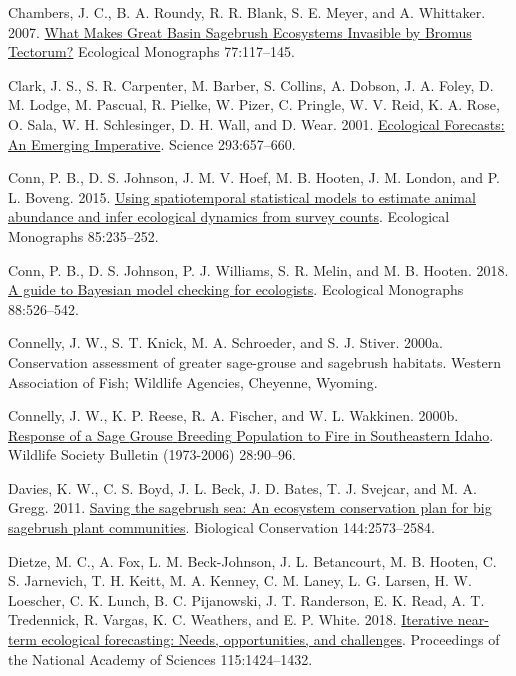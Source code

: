 \documentclass[
  12pt,
]{article}
\newlength{\cslhangindent}
\newlength{\cslentryspacingunit} %
\newenvironment{CSLReferences}[2] %
 {%
  \setlength{\parindent}{0pt}
  \ifodd #1
  \let\oldpar\par
  \def\par{\hangindent=\cslhangindent\oldpar}
  \fi
  \setlength{\parskip}{#2\cslentryspacingunit}
 }%
 {}
\begin{document}
\begin{CSLReferences}{1}{0}
\leavevmode{}%
Chambers, J. C., B. A. Roundy, R. R. Blank, S. E. Meyer, and A. Whittaker. 2007. \href{https://doi.org/10.1890/05-1991}{What {Makes} {Great} {Basin} {Sagebrush} {Ecosystems} {Invasible} by {Bromus} {Tectorum}?} Ecological Monographs 77:117--145.

\leavevmode{}%
Clark, J. S., S. R. Carpenter, M. Barber, S. Collins, A. Dobson, J. A. Foley, D. M. Lodge, M. Pascual, R. Pielke, W. Pizer, C. Pringle, W. V. Reid, K. A. Rose, O. Sala, W. H. Schlesinger, D. H. Wall, and D. Wear. 2001. \href{https://doi.org/10.1126/science.293.5530.657}{Ecological {Forecasts}: {An} {Emerging} {Imperative}}. Science 293:657--660.

\leavevmode{}%
Conn, P. B., D. S. Johnson, J. M. V. Hoef, M. B. Hooten, J. M. London, and P. L. Boveng. 2015. \href{https://doi.org/10.1890/14-0959.1}{Using spatiotemporal statistical models to estimate animal abundance and infer ecological dynamics from survey counts}. Ecological Monographs 85:235--252.

\leavevmode{}%
Conn, P. B., D. S. Johnson, P. J. Williams, S. R. Melin, and M. B. Hooten. 2018. \href{https://doi.org/10.1002/ecm.1314}{A guide to {Bayesian} model checking for ecologists}. Ecological Monographs 88:526--542.

\leavevmode{}%
Connelly, J. W., S. T. Knick, M. A. Schroeder, and S. J. Stiver. 2000a. Conservation assessment of greater sage-grouse and sagebrush habitats. Western Association of Fish; Wildlife Agencies, Cheyenne, Wyoming.

\leavevmode{}%
Connelly, J. W., K. P. Reese, R. A. Fischer, and W. L. Wakkinen. 2000b. \href{https://www.jstor.org/stable/4617288}{Response of a {Sage} {Grouse} {Breeding} {Population} to {Fire} in {Southeastern} {Idaho}}. Wildlife Society Bulletin (1973-2006) 28:90--96.

\leavevmode{}%
Davies, K. W., C. S. Boyd, J. L. Beck, J. D. Bates, T. J. Svejcar, and M. A. Gregg. 2011. \href{https://doi.org/10.1016/j.biocon.2011.07.016}{Saving the sagebrush sea: {An} ecosystem conservation plan for big sagebrush plant communities}. Biological Conservation 144:2573--2584.

\leavevmode{}%
Dietze, M. C., A. Fox, L. M. Beck-Johnson, J. L. Betancourt, M. B. Hooten, C. S. Jarnevich, T. H. Keitt, M. A. Kenney, C. M. Laney, L. G. Larsen, H. W. Loescher, C. K. Lunch, B. C. Pijanowski, J. T. Randerson, E. K. Read, A. T. Tredennick, R. Vargas, K. C. Weathers, and E. P. White. 2018. \href{https://doi.org/10.1073/pnas.1710231115}{Iterative near-term ecological forecasting: {Needs}, opportunities, and challenges}. Proceedings of the National Academy of Sciences 115:1424--1432.


\end{CSLReferences}
\end{document}
